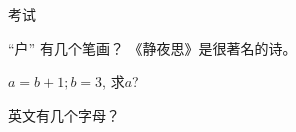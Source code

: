 \documentclass[addpoints]{exam}
\begin{document}
\begin{center}
  {\Huge 考试}
  \vskip 1pc
\end{center}

\vspace{5mm}

\vspace{5mm}

\begin{questions}
\question[2] ``户'' 有几个笔画？
\question 《静夜思》是很著名的诗。

\droptotalpoints %

\question[1] $a = b + 1; b = 3$, 求$a$?

\begin{oneparchoices}
\end{oneparchoices}

\question 英文有几个字母？

\begin{checkboxes}
\end{checkboxes}


\end{questions}

\clearpage
\begin{center}
\combinedgradetable[h][questions]
\end{center}
\end{document}
